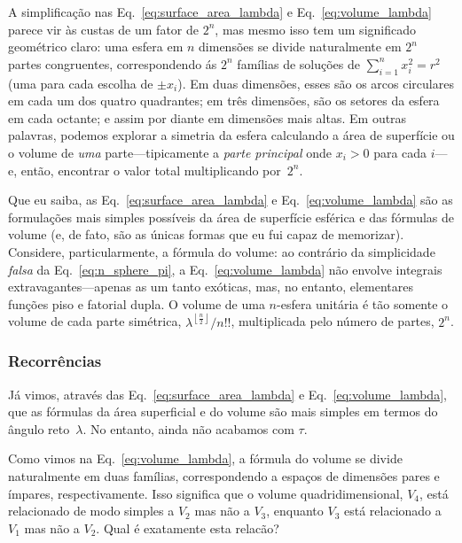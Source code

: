 {A simplificação nas Eq.~\eqref{eq:surface_area_lambda} e Eq.~\eqref{eq:volume_lambda} parece vir às custas de um fator de $2^n$, mas mesmo isso tem um significado geométrico claro: uma esfera em $n$ dimensões se divide naturalmente em $2^n$ partes congruentes, correspondendo ás $2^n$ famílias de soluções de $\sum_{i=1}^{n} x_i^2 = r^2$ (uma para cada escolha de $\pm x_i$). Em duas dimensões, esses são os arcos circulares em cada um dos quatro quadrantes; em três dimensões, são os setores da esfera em cada octante; e assim por diante em dimensões mais altas. Em outras palavras, podemos explorar a simetria da esfera calculando a área de superfície ou o volume de \emph{uma} parte---tipicamente a \emph{parte principal} onde $x_i > 0$ para cada $i$---e, então, encontrar o valor total multiplicando por~$2^n$.

Que eu saiba, as Eq.~\eqref{eq:surface_area_lambda} e Eq.~\eqref{eq:volume_lambda} são as formulações mais simples possíveis da área de superfície esférica e das fórmulas de volume (e, de fato, são as únicas formas que eu fui capaz de memorizar). Considere, particularmente, a fórmula do volume: ao contrário da simplicidade \emph{falsa} da Eq.~\eqref{eq:n_sphere_pi}, a Eq.~\eqref{eq:volume_lambda} não envolve integrais extravagantes---apenas as um tanto exóticas, mas, no entanto, elementares funções piso e fatorial dupla. O volume de uma $n$-esfera unitária é tão somente o volume de cada parte simétrica, $\lambda^{\left\lfloor \frac{n}{2} \right\rfloor}/n!!$, multiplicada pelo número de partes, $2^n$.


\subsubsection{Recorrências} %
\label{sec:recurrences}

Já vimos, através das Eq.~\eqref{eq:surface_area_lambda} e Eq.~\eqref{eq:volume_lambda}, que as fórmulas da área superficial e do volume são mais simples em termos do ângulo reto~$\lambda$. No entanto, ainda não acabamos com $\tau$.

Como vimos na Eq.~\eqref{eq:volume_lambda}, a fórmula do volume se divide naturalmente em duas famílias, correspondendo a espaços de dimensões pares e ímpares, respectivamente. Isso significa que o volume quadridimensional, $V_4$, está relacionado de modo simples a $V_2$ mas não a $V_3$, enquanto $V_3$ está relacionado a $V_1$ mas não a $V_2$. Qual é exatamente esta relacão?

}
